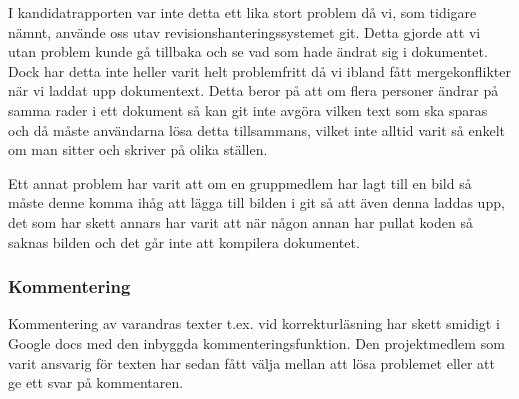 
I kandidatrapporten var inte detta ett lika stort problem då vi, som tidigare nämnt, använde oss utav revisionshanteringssystemet git. Detta gjorde att vi utan problem kunde gå tillbaka och se vad som hade ändrat sig i dokumentet. Dock har detta inte heller varit helt problemfritt då vi ibland fått mergekonflikter när vi laddat upp dokumentext. Detta beror på att om flera personer ändrar på samma rader i ett dokument så kan git inte avgöra vilken text som ska sparas och då måste användarna lösa detta tillsammans, vilket inte alltid varit så enkelt om man sitter och skriver på olika ställen.

Ett annat problem har varit att om en gruppmedlem har lagt till en bild så måste denne komma ihåg att lägga till bilden i git så att även denna laddas upp, det som har skett annars har varit att när någon annan har pullat koden så saknas bilden och det går inte att kompilera dokumentet.



\subsubsection{Kommentering}
Kommentering av varandras texter t.ex. vid korrekturläsning har skett smidigt i Google docs med den inbyggda kommenteringsfunktion. Den projektmedlem som varit ansvarig för texten har sedan fått välja mellan att lösa problemet eller att ge ett svar på kommentaren.

